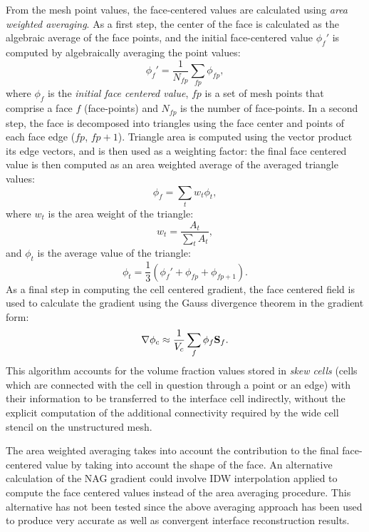 From the mesh point values, the face-centered values are calculated using
\emph{area weighted averaging}. As a first step, the center of the face is
calculated as the algebraic average of the face points, and the initial
face-centered value $\phi_{f}'$ is computed by algebraically averaging the
point values: 
%
\begin{equation} \phi_{f}' = \frac{1}{N_{fp}} \sum_{fp} \phi_{fp},
\end{equation}
%
where $\phi_{f}$ is the \emph{initial face centered value}, $fp$ is a set of
mesh points that comprise a face $f$ (face-points) and ${N_{fp}}$ is the number
of face-points. In a second step, the face is decomposed into triangles using
the face center and points of each face edge ($fp$, $fp+1$). Triangle area is
computed using the vector product its edge vectors, and is then used as a
weighting factor: the final face centered value is then computed as an area
weighted average of the averaged triangle values: 
%
\begin{equation} \phi_f = \sum_t w_t \phi_t, \end{equation}
%
where $w_t$ is the area weight of the triangle:
%
\begin{equation} w_t = \frac{A_t}{\sum_t A_t}, \end{equation}
%
and $\phi_t$ is the average value of the triangle: 
%
\begin{equation} \phi_t = \frac{1}{3} (\phi_f' + \phi_{fp} + \phi_{fp+1}).
\end{equation}
%
As a final step in computing the cell centered gradient, the face centered
field is used to calculate the gradient using the Gauss divergence theorem in
the gradient form: 
%
\begin{equation} 
\nabla{\phi}_c \approx \frac{1}{V_c} \sum_f \phi_f \mathbf S_f. 
\end{equation}
%
This algorithm accounts for the volume fraction values stored in \emph{skew
cells} (cells which are connected with the cell in question through a point or
an edge) with their information to be transferred to the interface cell
indirectly, without the explicit computation of the additional connectivity
required by the wide cell stencil on the unstructured mesh. 

The area weighted averaging takes into account the contribution to the final
face-centered value by taking into account the shape of the face. An
alternative calculation of the NAG gradient could involve IDW interpolation
applied to compute the face centered values instead of the area averaging
procedure. This alternative has not been tested since the above averaging 
approach has been used to produce very accurate as well as convergent 
interface reconstruction results.

